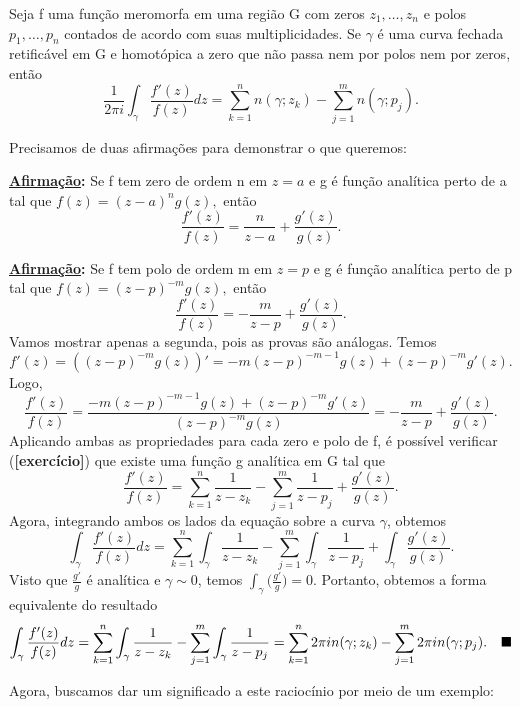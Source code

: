 \documentclass[complex.tex]{subfiles}
\begin{document}
\hypertarget{argument-principle}{\begin{theorem*}
		Seja f uma função meromorfa em uma região G com zeros \(z_{1},\dotsc ,z_{n}\) e polos \(p_{1},\dotsc , p_{n} \) contados
		de acordo com suas multiplicidades. Se \(\gamma \) é uma curva fechada retificável em G e homotópica a zero que não passa nem por polos
		nem por zeros, então
		\[
			\frac{1}{2\pi i}\int_{\gamma }^{}\frac{f'(z)}{f(z)}dz = \sum\limits_{k=1}^{n}n(\gamma ; z_{k}) - \sum\limits_{j=1}^{m}n(\gamma ; p_{j}).
		\]
	\end{theorem*}}
\begin{proof*}
	Precisamos de duas afirmações para demonstrar o que queremos:

	\textbf{\underline{Afirmação}:} Se f tem zero de ordem n em \(z=a\) e g é função analítica perto de a tal que \(f(z) = (z-a)^{n}g(z),\) então
	\[
		\frac{f'(z)}{f(z)} = \frac{n}{z-a} + \frac{g'(z)}{g(z)}.
	\]

	\textbf{\underline{Afirmação}:} Se f tem polo de ordem m em \(z=p\) e g é função analítica perto de p tal que \(f(z) = (z-p)^{-m}g(z),\) então
	\[
		\frac{f'(z)}{f(z)} = -\frac{m}{z-p} + \frac{g'(z)}{g(z)}.
	\]
	Vamos mostrar apenas a segunda, pois as provas são análogas. Temos
	\[
		f'(z) = ((z-p)^{-m}g(z))' = -m(z-p)^{-m-1}g(z) + (z-p)^{-m}g'(z).
	\]
	Logo,
	\[
		\frac{f'(z)}{f(z)} = \frac{-m(z-p)^{-m-1}g(z) + (z-p)^{-m}g'(z)}{(z-p)^{-m}g(z)} = -\frac{m}{z-p} + \frac{g'(z)}{g(z)}.
	\]
	Aplicando ambas as propriedades para cada zero e polo de f, é possível verificar (\textbf{[exercício]}) que existe uma função g analítica em G tal que
	\[
		\frac{f'(z)}{f(z)} = \sum\limits_{k=1}^{n}\frac{1}{z-z_{k}} - \sum\limits_{j=1}^{m}\frac{1}{z-p_{j}} + \frac{g'(z)}{g(z)}.
	\]
	Agora, integrando ambos os lados da equação sobre a curva \(\gamma \), obtemos
	\[
		\int_{\gamma }^{}\frac{f'(z)}{f(z)}dz = \sum\limits_{k=1}^{n}\int_{\gamma }^{}\frac{1}{z-z_{k}} - \sum\limits_{j=1}^{m}\int_{\gamma }^{}\frac{1}{z-p_{j}} + \int_{\gamma }^{}\frac{g'(z)}{g(z)}.
	\]
	Visto que \(\frac{g'}{g}\) é analítica e \(\gamma \sim 0\), temos \(\int_{\gamma }^{}\biggl(\frac{g'}{g}\biggr) = 0\). Portanto, obtemos a forma equivalente do resultado
	\[
		\int_{\gamma }^{}\frac{f'(z)}{f(z)}dz = \sum\limits_{k=1}^{n}\int_{\gamma }^{}\frac{1}{z-z_{k}} - \sum\limits_{j=1}^{m}\int_{\gamma }^{}\frac{1}{z-p_{j}} = \sum\limits_{k=1}^{n}2\pi i n(\gamma ; z_{k}) - \sum\limits_{j=1}^{m}2\pi i n(\gamma ; p_{j}).\quad \text{$\blacksquare$}
	\]
\end{proof*}
Agora, buscamos dar um significado a este raciocínio por meio de um exemplo:
\end{document}
